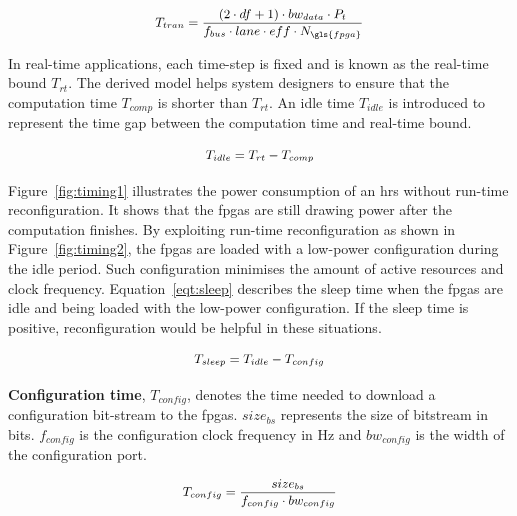 \begin{equation}
\small
\begin{aligned}
T_{tran} = \frac{(2 \cdot df + 1) \cdot bw_{data} \cdot P_t}{f_{bus} \cdot lane \cdot eff \cdot N_{\gls{fpga}}}
\end{aligned}
\label{eqt:data}
\end{equation}

In real-time applications, each time-step is fixed and is known as the real-time bound $T_{rt}$.
The derived model helps system designers to ensure that the computation time $T_{comp}$ is shorter than $T_{rt}$.
An idle time $T_{idle}$ is introduced to represent the time gap between the computation time and real-time bound.

\begin{equation}
\small
\begin{aligned}
T_{idle} = T_{rt} - T_{comp}
\end{aligned}
\label{eqt:idle}
\end{equation}

Figure~\ref{fig:timing1} illustrates the power consumption of an \gls{hrs} without run-time reconfiguration.
It shows that the \gls{fpga}s are still drawing power after the computation finishes.
By exploiting run-time reconfiguration as shown in Figure~\ref{fig:timing2}, the \gls{fpga}s are loaded with a low-power configuration during the idle period.
Such configuration minimises the amount of active resources and clock frequency.
Equation~\ref{eqt:sleep} describes the sleep time when the \gls{fpga}s are idle and being loaded with the low-power configuration.
If the sleep time is positive, reconfiguration would be helpful in these situations.

\begin{equation}
\small
\begin{aligned}
T_{sleep} = T_{idle} - T_{config}
\end{aligned}
\label{eqt:sleep}
\end{equation}

\textbf{Configuration time}, $T_{config}$, denotes the time needed to download a configuration bit-stream to the \gls{fpga}s.
$size_{bs}$ represents the size of bitstream in bits.
$f_{config}$ is the configuration clock frequency in Hz and $bw_{config}$ is the width of the configuration port.

\begin{equation}
\small
\begin{aligned}
T_{config} = \frac{size_{bs}}{f_{config} \cdot bw_{config}}
\end{aligned}
\label{eqt:cf}
\end{equation}

